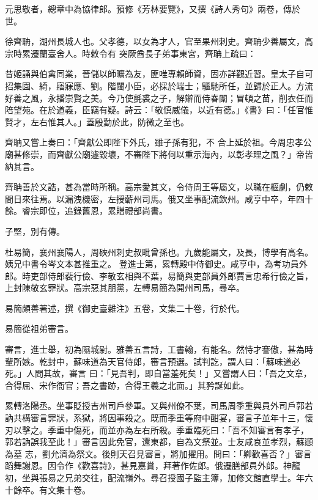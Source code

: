 \begin{pinyinscope}
 元思敬者，總章中為協律郎。預修《芳林要覽》，又撰《詩人秀句》兩卷，傳於世。



 徐齊聃，湖州長城人也。父孝德，以女為才人，官至果州刺史。齊聃少善屬文，高宗時累遷蘭臺舍人。時敕令有
 突厥酋長子弟事東宮，齊聃上疏曰：



 昔姬誦與伯禽同業，晉儲以師曠為友，匪唯專賴師資，固亦詳觀近習。皇太子自可招集園、綺，寤寐應、劉。階闥小臣，必採於端士；驅馳所任，並歸於正人。方流好善之風，永播崇賢之美。今乃使氈裘之子，解辮而侍春闈；冒頓之苗，削衣任而陪望苑。在於道義，臣竊有疑。詩云：「敬慎威儀，以近有德。」《書》曰：「任官惟賢才，左右惟其人。」蓋殷勤於此，防微之至也。



 齊聃又嘗上奏曰：「齊獻公即陛下外氏，雖子孫有犯，不
 合上延於祖。今周忠孝公廟甚修崇，而齊獻公廟遽毀壞，不審陛下將何以重示海內，以彰孝理之風？」帝皆納其言。



 齊聃善於文誥，甚為當時所稱。高宗愛其文，令侍周王等屬文，以職在樞劇，仍敕間日來往焉。以漏洩機密，左授蘄州司馬。俄又坐事配流欽州。咸亨中卒，年四十餘。睿宗即位，追錄舊恩，累贈禮部尚書。



 子堅，別有傳。



 杜易簡，襄州襄陽人，周硤州刺史叔毗曾孫也。九歲能屬文，及長，博學有高名。姨兄中書令岑文本甚推重之。
 登進士第，累轉殿中侍御史。咸亨中，為考功員外郎。時吏部侍郎裴行儉、李敬玄相與不葉，易簡與吏部員外郎賈言忠希行儉之旨，上封陳敬玄罪狀。高宗惡其朋黨，左轉易簡為開州司馬，尋卒。



 易簡頗善著述，撰《御史臺雜注》五卷，文集二十卷，行於代。



 易簡從祖弟審言。



 審言，進士舉，初為隰城尉。雅善五言詩，工書翰，有能名。然恃才謇傲，甚為時輩所嫉。乾封中，蘇味道為天官侍郎，審言預選。試判訖，謂人曰：「蘇味道必死。」人問其故，審言
 曰：「見吾判，即自當羞死矣！」又嘗謂人曰：「吾之文章，合得屈、宋作衙官；吾之書跡，合得王羲之北面。」其矜誕如此。



 累轉洛陽丞。坐事貶授吉州司戶參軍。又與州僚不葉，司馬周季重與員外司戶郭若訥共構審言罪狀，系獄，將因事殺之。既而季重等府中酣宴，審言子並年十三，懷刃以擊之。季重中傷死，而並亦為左右所殺。季重臨死曰：「吾不知審言有孝子，郭若訥誤我至此！」審言因此免官，還東都，自為文祭並。士友咸哀並孝烈，蘇頲為墓
 志，劉允濟為祭文。後則天召見審言，將加擢用。問曰：「卿歡喜否？」審言蹈舞謝恩。因令作《歡喜詩》，甚見嘉賞，拜著作佐郎。俄遷膳部員外郎。神龍初，坐與張易之兄弟交往，配流嶺外。尋召授國子監主簿，加修文館直學士。年六十餘卒。有文集十卷。




\end{pinyinscope}
